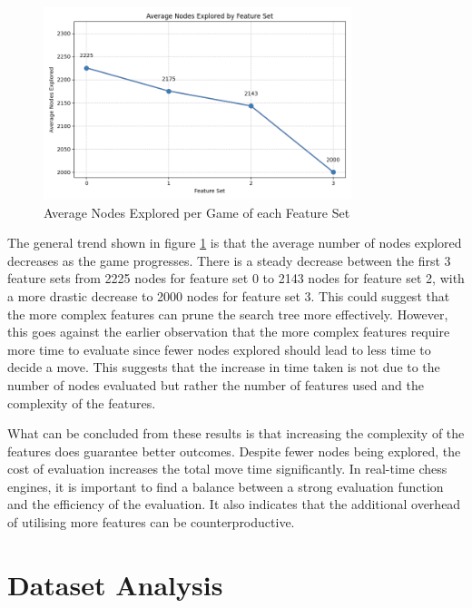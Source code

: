 \begin{figure}[H]
    \centering
    \includegraphics[width=0.8\textwidth]{images/plots/featureSet/Feature_set_vs_avg_nodes_explored.png}
    \caption{Average Nodes Explored per Game of each Feature Set}
    \label{fig: feature_set_vs_avg_nodes_explored}
\end{figure}

The general trend shown in figure \ref{fig: feature_set_vs_avg_nodes_explored} is that the average number of nodes explored decreases as the game progresses. There is a steady decrease between the first 3 feature sets from 2225 nodes for feature set 0 to 2143 nodes for feature set 2, with a more drastic decrease to 2000 nodes for feature set 3. This could suggest that the more complex features can prune the search tree more effectively. However, this goes against the earlier observation that the more complex features require more time to evaluate since fewer nodes explored should lead to less time to decide a move. This suggests that the increase in time taken is not due to the number of nodes evaluated but rather the number of features used and the complexity of the features. 

What can be concluded from these results is that increasing the complexity of the features does guarantee better outcomes. Despite fewer nodes being explored, the cost of evaluation increases the total move time significantly. In real-time chess engines, it is important to find a balance between a strong evaluation function and the efficiency of the evaluation. It also indicates that the additional overhead of utilising more features can be counterproductive.

\section{Dataset Analysis}


